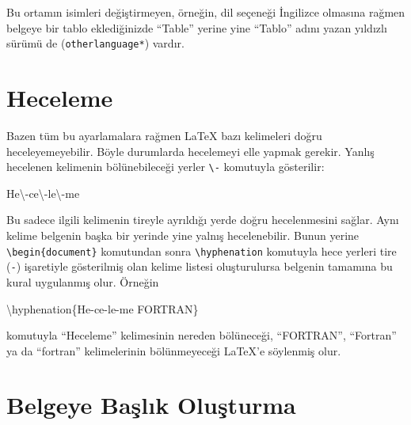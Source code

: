 \documentclass[
  10pt,
]{scrbook}
\newenvironment{Shaded}{\begin{snugshade}}{\end{snugshade}}
\newcommand{\NormalTok}[1]{#1}
\newcommand{\SpecialCharTok}[1]{\textcolor[rgb]{0.00,0.00,0.00}{#1}}
\begin{document}
Bu ortamın isimleri değiştirmeyen, örneğin, dil seçeneği İngilizce
olmasına rağmen belgeye bir tablo eklediğinizde ``Table'' yerine yine
``Tablo'' adını yazan yıldızlı sürümü de (\texttt{otherlanguage*}) vardır.

\hypertarget{heceleme}{%
\section{Heceleme}\label{heceleme}}

Bazen tüm bu ayarlamalara rağmen LaTeX bazı kelimeleri doğru
heceleyemeyebilir. Böyle durumlarda hecelemeyi elle yapmak gerekir.
Yanlış hecelenen kelimenin bölünebileceği yerler \texttt{\textbackslash{}-} komutuyla
gösterilir:

\begin{Shaded}
\begin{Highlighting}[]
\NormalTok{He\textbackslash{}}\SpecialCharTok{{-}}\NormalTok{ce\textbackslash{}}\SpecialCharTok{{-}}\NormalTok{le\textbackslash{}}\SpecialCharTok{{-}}\NormalTok{me}
\end{Highlighting}
\end{Shaded}

Bu sadece ilgili kelimenin tireyle ayrıldığı yerde doğru hecelenmesini
sağlar. Aynı kelime belgenin başka bir yerinde yine yalnış
hecelenebilir. Bunun yerine \texttt{\textbackslash{}begin\{document\}} komutundan sonra
\texttt{\textbackslash{}hyphenation} komutuyla hece yerleri tire (\texttt{-}) işaretiyle gösterilmiş
olan kelime listesi oluşturulursa belgenin tamamına bu kural uygulanmış
olur. Örneğin

\begin{Shaded}
\begin{Highlighting}[]
\NormalTok{\textbackslash{}hyphenation\{He}\SpecialCharTok{{-}}\NormalTok{ce}\SpecialCharTok{{-}}\NormalTok{le}\SpecialCharTok{{-}}\NormalTok{me FORTRAN\}}
\end{Highlighting}
\end{Shaded}

komutuyla ``Heceleme'' kelimesinin nereden bölüneceği, ``FORTRAN'', ``Fortran'' ya da
``fortran'' kelimelerinin bölünmeyeceği LaTeX'e söylenmiş olur.

\hypertarget{belgeye-baux15flux131k-oluux15fturma}{%
\section{Belgeye Başlık Oluşturma}\label{belgeye-baux15flux131k-oluux15fturma}}
\end{document}
